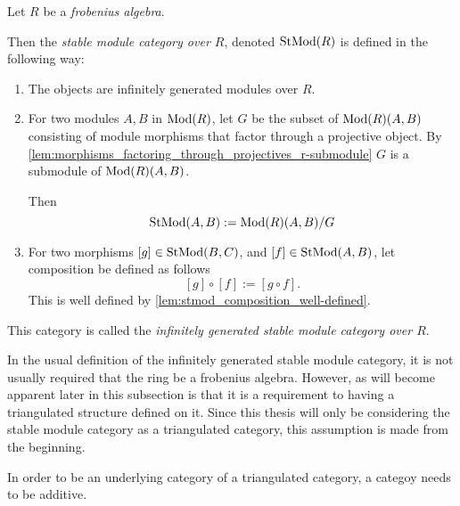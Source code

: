 \begin{definition}
    \label{def:stable_module_category}
    Let \( R \) be a \emph{frobenius algebra}.

    Then the \emph{stable module category over \( R \)}, denoted \( \operatorname{StMod}(R) \) is defined in the following way:
    \begin{enumerate}
        \item {
            The objects are infinitely generated modules over \( R \).
        }
        \item {
            For two modules \( A, B \) in \( \operatorname{Mod}(R) \), let \( G \) be the subset of \( \operatorname{Mod}(R)(A, B) \) consisting of module morphisms that factor through a projective object. By \autoref{lem:morphisms_factoring_through_projectives_r-submodule} \( G \) is a submodule of \( \operatorname{Mod}(R)(A, B) \).
            
            Then
            \[
                \operatorname{StMod}(A, B) := \operatorname{Mod}(R)(A, B)/G
            \]
        }
        \item {
            For two morphisms \( [g] \in \operatorname{StMod}(B, C) \), and \( [f] \in \operatorname{StMod}(A, B) \), let composition be defined as follows
            \[
                [g] \circ [f] := [g \circ f].
            \]
            This is well defined by \autoref{lem:stmod_composition_well-defined}.
        }
    \end{enumerate}

    This category is called the \emph{infinitely generated stable module category over \( R \)}.
\end{definition}

In the usual definition of the infinitely generated stable module category, it is not usually required that the ring be a frobenius algebra. However, as will become apparent later in this subsection is that it is a requirement to having a triangulated structure defined on it. Since this thesis will only be considering the stable module category as a triangulated category, this assumption is made from the beginning.

In order to be an underlying category of a triangulated category, a categoy needs to be additive.

